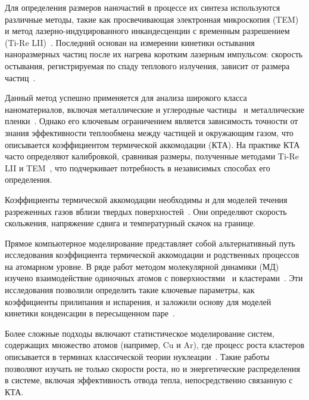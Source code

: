 Для определения размеров наночастий в процессе их синтеза используются различные методы, такие как просвечивающая электронная микроскопия (TEM) и метод лазерно-индуцированного инкандесценции с временным разрешением (Ti-Re LII)~\cite{gurentsov_analysis_2013, eremin_nanoparticle_2006}. Последний основан на измерении кинетики остывания наноразмерных частиц после их нагрева коротким лазерным импульсом: скорость остывания, регистрируемая по спаду теплового излучения, зависит от размера частиц~\cite{gurentsov_analysis_2013}.

Данный метод успешно применяется для анализа широкого класса наноматериалов, включая металлические и углеродные частицы~\cite{gurentsov_analysis_2013, eremin_nanoparticle_2006, baranyshyn_heat_2010, gurentsov_nanoparticles_2017, nemchinsky_simulation_2024} и металлические пленки~\cite{luo_molecular_2025}.  Однако его ключевым ограничением является зависимость точности от знания эффективности теплообмена между частицей и окружающим газом, что описывается коэффициентом термической аккомодации (КТА). На практике КТА часто определяют калибровкой, сравнивая размеры, полученные методами Ti-Re LII и TEM~\cite{eremin_influence_2008}, что подчеркивает потребность в независимых способах его определения.

Коэффициенты термической аккомодации необходимы и для моделей течения разреженных газов вблизи твердых поверхностей~\cite{yousefi-nasab_review_2024}. Они определяют скорость скольжения, напряжение сдвига и температурный скачок на границе. 

Прямое компьютерное моделирование представляет собой альтернативный путь исследования коэффициента термической аккомодации и родственных процессов на атомарном уровне. В ряде работ методом молекулярной динамики (МД) изучено взаимодействие одиночных атомов с поверхностями~\cite{sipkens_examination_2015} и кластерами~\cite{insepov_kinetics_1991, insepov_jet_1991}. Эти исследования позволили определить такие ключевые параметры, как коэффициенты прилипания и испарения, и заложили основу для моделей кинетики конденсации в пересыщенном паре~\cite{insepov_kinetics_1991, insepov_jet_1991}.

Более сложные подходы включают статистическое моделирование систем, содержащих множество атомов (например, Cu и Ar), где процесс роста кластеров описывается в терминах классической теории нуклеации~\cite{eremin_influence_2008, vorontsov_statistics_2011, vorontsov_kinetics_2012, korenchenko_analysis_2016}. Такие работы позволяют изучать не только скорости роста, но и энергетические распределения в системе, включая эффективность отвода тепла, непосредственно связанную с КТА.

